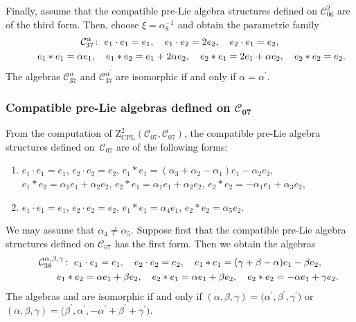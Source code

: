 \documentclass[pdftex]{sigma}
\numberwithin{equation}{section}
\begin{document}
Finally, assume that the compatible
pre-Lie algebra structures defined on $\mathcal{C}_{06}^{2}$ are of the third
form. Then, choose $\xi = {\alpha^{-1} _{8}}$ and obtain the parametric
family
\begin{gather*}
\mathcal{C}_{37}^{\alpha } \colon \
e_{1}\cdot e_{1}=e_{1}, \quad e_{1}\cdot e_{2}=2e_{2}, \quad e_{2}\cdot
e_{1}=e_{2}, \\
\hphantom{\mathcal{C}_{37}^{\alpha } \colon} \
e_{1}\ast e_{1}=\alpha e_{1}, \quad e_{1}\ast e_{2}=e_{1}+2\alpha e_{2}, \quad
e_{2}\ast e_{1}=2e_{1}+\alpha e_{2}, \quad e_{2}\ast e_{2}=e_{2}.
\end{gather*}
The algebras $\mathcal{C}_{37}^{\alpha }$ and $\mathcal{C}_{37}^{\alpha ^{\prime }}
$ are isomorphic if and only if $\alpha =\alpha ^{\prime }$.

\subsubsection[Compatible pre-Lie algebras defined on C\_\{07\}]{Compatible pre-Lie algebras defined on $\boldsymbol{\mathcal{C}_{07}}$}

From the computation of $\mathrm{Z}_{\mathrm{CPL}}^{2}(\mathcal{C}_{07},
\mathcal{C}_{07})$, the compatible pre-Lie algebra structures defined on~$\mathcal{C}_{07}$ are of the following forms:
\begin{enumerate}\itemsep=0pt
\item[(1)] $e_{1}\cdot e_{1}=e_{1}$, $e_{2}\cdot e_{2}=e_{2}$,
$e_{1}\ast e_{1}=( \alpha _{3}+\alpha _{2}-\alpha _{1})
e_{1}-\alpha _{2}e_{2}$, $e_{1}\ast e_{2}=\alpha _{1}e_{1}+\alpha
_{2}e_{2}$, $e_{2}\ast e_{1}=\alpha _{1}e_{1}+\alpha _{2}e_{2}$, $e_{2}\ast e_{2}=-\alpha _{1}e_{1}+\alpha _{3}e_{2}$,
\item[(2)] $e_{1}\cdot e_{1}=e_{1}$, $e_{2}\cdot e_{2}=e_{2}$,
$e_{1}\ast e_{1}=\alpha _{4}e_{1}$, $e_{2}\ast e_{2}=\alpha _{5}e_{2}$.
\end{enumerate}

We may assume that $\alpha _{4}\neq \alpha _{5}$.
Suppose first that the
compatible pre-Lie algebra structures defined on $\mathcal{C}_{07}$ has the
first form. Then we obtain the algebras
\begin{gather*}
\mathcal{C}_{38}^{\alpha ,\beta ,\gamma } \colon \
e_{1}\cdot e_{1}=e_{1},\quad e_{2}\cdot e_{2}=e_{2}, \quad
e_{1}\ast e_{1}=( \gamma +\beta -\alpha ) e_{1}-\beta e_{2},\\
\hphantom{\mathcal{C}_{38}^{\alpha ,\beta ,\gamma } \colon} \
e_{1}\ast e_{2}=\alpha e_{1}+\beta e_{2}, \quad
e_{2}\ast e_{1}=\alpha
e_{1}+\beta e_{2},\quad e_{2}\ast e_{2}=-\alpha e_{1}+\gamma e_{2}.
\end{gather*}
The algebras  and  are isomorphic
if and only if
$
(\alpha, \beta, \gamma)=\bigl(\alpha ^{\prime },\beta ^{\prime },
\gamma ^{\prime }\bigr)$ or $(\alpha, \beta, \gamma)=\bigl(\beta ^{\prime },\alpha ^{\prime
}, -\alpha ^{\prime }+\beta ^{\prime }+\gamma ^{\prime }\bigr)$.
\end{document}
